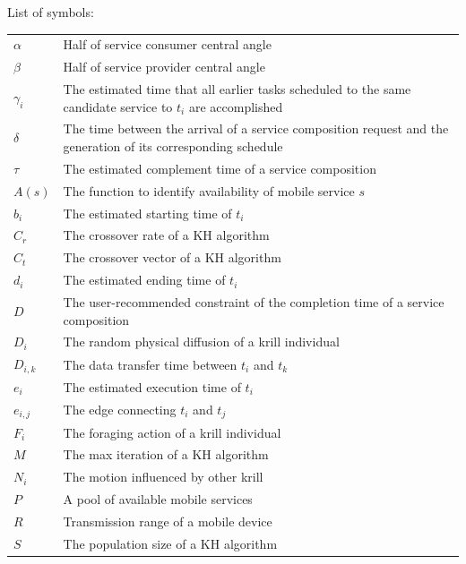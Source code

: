 \documentclass[journal]{IEEEtran}
\begin{document}
\noindent List of symbols: 
~\\

\noindent
\begin{tabular}{@{} l p{7.36cm} }
$\alpha$      &   Half of service consumer central angle \\
$\beta$       &   Half of service provider central angle \\
$\gamma_{i}$  &   The estimated time that all earlier tasks scheduled to the same candidate service to $t_i$ are accomplished  \\
$\delta$      &   The time between the arrival of a service composition request and the generation of its corresponding schedule \\
$\tau$        &   The estimated complement time of a service composition \\
$A(s)$      &   The function to identify availability of mobile service $s$ \\
$b_i$         &   The estimated starting time of $t_i$ \\
$C_{r}$       &   The crossover rate of a KH algorithm \\
$C_{t}$       &   The crossover vector of a KH algorithm \\
$d_i$         &   The estimated ending time of $t_i$ \\
$D$           &   The user-recommended constraint of the completion time of a service composition \\
$D_i$         &   The random physical diffusion of a krill individual \\
$D_{i,k}$     &   The data transfer time between $t_i$ and $t_k$ \\
$e_i$         &   The estimated execution time of $t_i$ \\
$e_{i,j}$     &   The edge connecting $t_i$ and $t_j$ \\
$F_i$         &   The foraging action of a krill individual \\ 
$M$           &   The max iteration of a KH algorithm \\
$N_i$         &   The motion influenced by other krill \\
$P$           &   A pool of available mobile services \\
$R$           &   Transmission range of a mobile device \\
$S$           &   The population size of a KH algorithm \\

\end{tabular}
\end{document}
